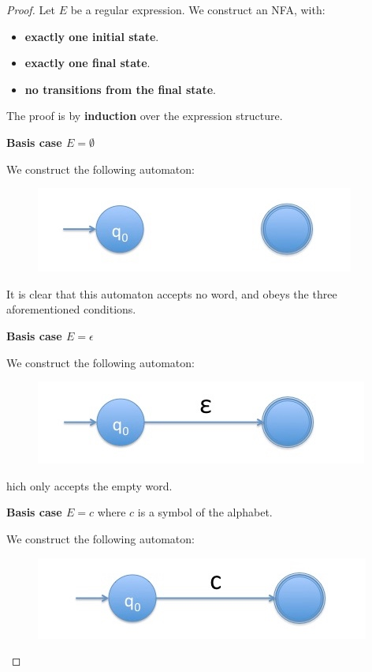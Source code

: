 \documentclass[a4paper, 12pt]{article}
\begin{document}
\begin{proof}

Let $E$ be a regular expression. We construct an NFA, with:
  \begin{itemize}
  	\item  \textbf{exactly one initial state}.
  	\item  \textbf{exactly one final state}.
  	\item  \textbf{no transitions from the final state}.
  \end{itemize}

The proof is by \textbf{induction} over the expression structure.

\textbf{Basis case $E=\emptyset$}

We construct the following automaton:

\begin{figure}[!htb]
\centering
\includegraphics[max width=\textwidth]{:lfa:emptyset.jpg}
\end{figure}


It is clear that this automaton accepts no word, and obeys the three aforementioned conditions.

\textbf{Basis case $E=\epsilon$}

We construct the following automaton:

\begin{figure}[!htb]
\centering
\includegraphics[max width=\textwidth]{:lfa:emptyword.jpg}
\end{figure}


hich only accepts the empty word.

\textbf{Basis case $E=c$} where $c$ is a symbol of the alphabet.

We construct the following automaton:


\begin{figure}[!htb]
\centering
\includegraphics[max width=\textwidth]{:lfa:char.jpg}
\end{figure}



\end{proof}
\end{document}
